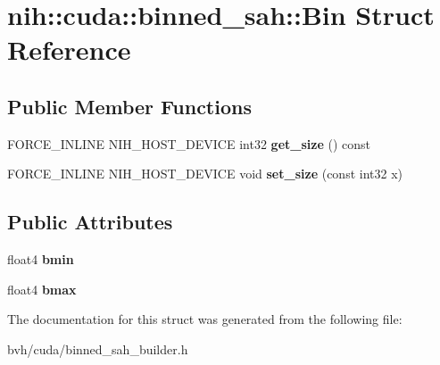\hypertarget{structnih_1_1cuda_1_1binned__sah_1_1_bin}{
\section{nih\-:\-:cuda\-:\-:binned\-\_\-sah\-:\-:\-Bin \-Struct \-Reference}
\label{structnih_1_1cuda_1_1binned__sah_1_1_bin}
}
\subsection*{\-Public \-Member \-Functions}
\begin{DoxyCompactItemize}
\item 
\hypertarget{structnih_1_1cuda_1_1binned__sah_1_1_bin_a8d7dae4c8e2809b98739023176633f15}{
\-F\-O\-R\-C\-E\-\_\-\-I\-N\-L\-I\-N\-E \-N\-I\-H\-\_\-\-H\-O\-S\-T\-\_\-\-D\-E\-V\-I\-C\-E int32 {\bfseries get\-\_\-size} () const }
\label{structnih_1_1cuda_1_1binned__sah_1_1_bin_a8d7dae4c8e2809b98739023176633f15}

\item 
\hypertarget{structnih_1_1cuda_1_1binned__sah_1_1_bin_a698ed11fa1cd7baef783268aa8a793dc}{
\-F\-O\-R\-C\-E\-\_\-\-I\-N\-L\-I\-N\-E \-N\-I\-H\-\_\-\-H\-O\-S\-T\-\_\-\-D\-E\-V\-I\-C\-E void {\bfseries set\-\_\-size} (const int32 x)}
\label{structnih_1_1cuda_1_1binned__sah_1_1_bin_a698ed11fa1cd7baef783268aa8a793dc}

\end{DoxyCompactItemize}
\subsection*{\-Public \-Attributes}
\begin{DoxyCompactItemize}
\item 
\hypertarget{structnih_1_1cuda_1_1binned__sah_1_1_bin_acc1ce983f35d7f63080e024e0ce6ada2}{
float4 {\bfseries bmin}}
\label{structnih_1_1cuda_1_1binned__sah_1_1_bin_acc1ce983f35d7f63080e024e0ce6ada2}

\item 
\hypertarget{structnih_1_1cuda_1_1binned__sah_1_1_bin_a81e938dea222b0f3dc61dbe76d9fd770}{
float4 {\bfseries bmax}}
\label{structnih_1_1cuda_1_1binned__sah_1_1_bin_a81e938dea222b0f3dc61dbe76d9fd770}

\end{DoxyCompactItemize}


\-The documentation for this struct was generated from the following file\-:\begin{DoxyCompactItemize}
\item 
bvh/cuda/binned\-\_\-sah\-\_\-builder.\-h\end{DoxyCompactItemize}
